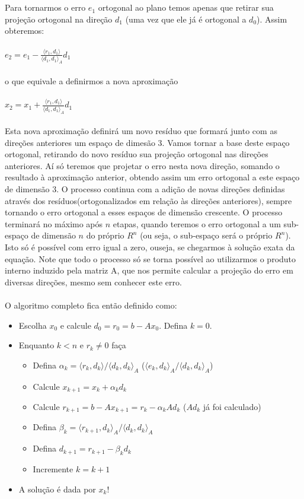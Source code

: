 \documentclass[a4paper,11pt]{article}
\begin{document}
\\~\\
Para tornarmos o erro $e_{1}$ ortogonal ao plano temos apenas que retirar sua projeção ortogonal na direção $d_{1}$ (uma vez que ele já é ortogonal a $d_{0}$). Assim obteremos:
\\~\\
$e_{2} = e_{1} - \frac{\langle r_{1} , d_{1} \rangle}{\langle d_{1} , d_{1} \rangle_{A}} d_{1}$
\\~\\
o que equivale a definirmos a nova aproximação
\\~\\
$x_{2} = x_{1} + \frac{\langle r_{1} , d_{1} \rangle}{\langle d_{1} , d_{1} \rangle_{A}} d_{1}$
\\~\\
Esta nova aproximação definirá um novo resíduo que formará junto com as direções anteriores um espaço de dimesão 3. Vamos tornar a base deste espaço ortogonal, retirando do novo resíduo sua projeção ortogonal nas direções anteriores. Aí só teremos que projetar o erro nesta nova direção, somando o resultado à aproximação anterior, obtendo assim um erro ortogonal a este espaço de dimensão 3. O processo continua com a adição de novas direções definidas através dos resíduos(ortogonalizados em relação às direções anteriores), sempre tornando o erro ortogonal a esses espaços de dimensão crescente. O processo terminará no máximo após $n$ etapas, quando teremos o erro ortogonal a um sub-espaço de dimensão $n$ do próprio $R^{n}$ (ou seja, o sub-espaço será o próprio $R^{n}$). Isto só é possível com erro igual a zero, ouseja, se chegarmos à solução exata da equação. Note que todo o processo só se torna possível ao utilizarmos o produto interno induzido pela matriz A, que nos permite calcular a projeção do erro em diversas direções, mesmo sem conhecer este erro. \\~\\O algoritmo completo fica então definido como:
\begin{itemize}
\item Escolha $x_{0}$ e calcule $d_{0}=r_{0}=b-Ax_{0}$. Defina $k=0$.
\item Enquanto $k < n$ e $r_{k} \neq 0$ faça
  \begin{itemize}
  \item Defina $\alpha_{k} = \langle r_{k} , d_{k} \rangle / \langle d_{k} , d_{k} \rangle_{A}$ ($\langle e_{k} , d_{k} \rangle_{A} / \langle d_{k} , d_{k} \rangle_{A}$)
  \item Calcule $x_{k+1} = x_{k} + \alpha_{k}d_{k}$
  \item Calcule $r_{k+1} = b - Ax_{k+1} = r_{k} - \alpha_{k}Ad_{k}$ ($Ad_{k}$ já foi calculado)
  \item Defina $\beta_{k} = \langle r_{k+1} , d_{k} \rangle_{A} / \langle d_{k} , d_{k} \rangle_{A}$
  \item Defina $d_{k+1} = r_{k+1} - \beta_{k}d_{k}$
  \item Incremente $k = k + 1$
  \end{itemize}
\item A solução é dada por $x_{k}$!
\end{itemize}
\end{document}
